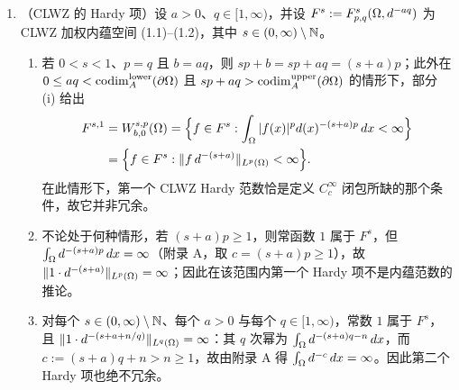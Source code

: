 \begin{theorem}
\begin{enumerate}[label=(\roman*)]
  \item （CLWZ 的 Hardy 项）设 $a>0$、$q\in[1,\infty)$，并设 $F^s:=F^{s}_{p,q}(\Omega,d^{-aq})$ 为 CLWZ 加权内蕴空间 (1.1)--(1.2)，其中 $s\in(0,\infty)\setminus\mathbb{N}$。
  \begin{enumerate}[label=(\alph*)]
    \item 若 $0<s<1$、$p=q$ 且 $b=aq$，则 $sp+b=sp+aq=(s+a)p$；此外在 $0\le aq<\operatorname{codim}_{A}^{\mathrm{lower}}(\partial\Omega)$ 且 $sp+aq>\operatorname{codim}_{A}^{\mathrm{upper}}(\partial\Omega)$ 的情形下，部分 (i) 给出
    \begin{align*}
      F^{s,1}&=W_{b,0}^{s,p}(\Omega)
      =\Big\{f\in F^s:\int_\Omega|f(x)|^p d(x)^{-(s+a)p}\,dx<\infty\Big\}\\
      &=\Big\{f\in F^s:\|f\,d^{-(s+a)}\|_{L^p(\Omega)}<\infty\Big\}.
    \end{align*}
    在此情形下，第一个 CLWZ Hardy 范数恰是定义 $C_c^\infty$ 闭包所缺的那个条件，故它并非冗余。
    \item 不论处于何种情形，若 $(s+a)p\ge1$，则常函数 $1$ 属于 $F^s$，但 $\int_\Omega d^{-(s+a)p}\,dx=\infty$（附录 A，取 $c=(s+a)p\ge1$），故 $\|1\cdot d^{-(s+a)}\|_{L^p(\Omega)}=\infty$；因此在该范围内第一个 Hardy 项不是内蕴范数的推论。
    \item 对每个 $s\in(0,\infty)\setminus\mathbb{N}$、每个 $a>0$ 与每个 $q\in[1,\infty)$，常数 $1$ 属于 $F^s$，且 $\|1\cdot d^{-(s+a+n/q)}\|_{L^q(\Omega)}=\infty$：其 $q$ 次幂为 $\int_\Omega d^{-(s+a)q-n}\,dx$，而 $c:=(s+a)q+n>n\ge1$，故由附录 A 得 $\int_\Omega d^{-c}\,dx=\infty$。因此第二个 Hardy 项也绝不冗余。
  \end{enumerate}
\end{enumerate}
\end{theorem}

